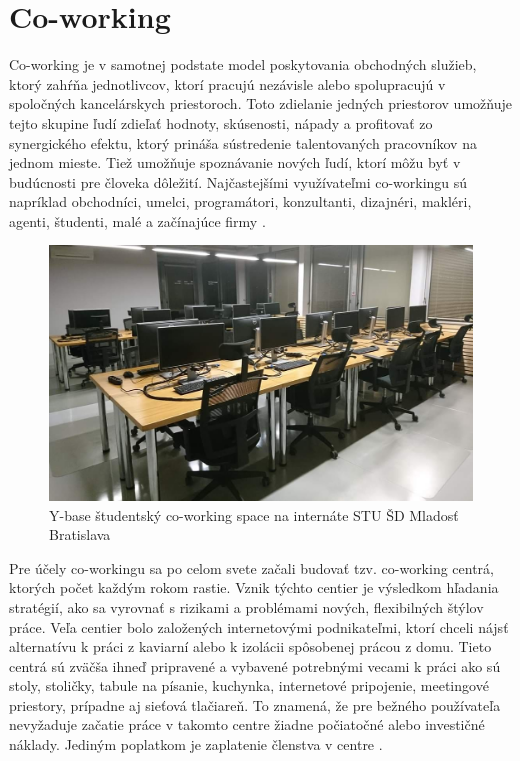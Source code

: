 \section{Co-working}
\indent Co-working je v samotnej podstate model poskytovania obchodných služieb, ktorý zahŕňa jednotlivcov, ktorí pracujú nezávisle alebo spolupracujú v spoločných kancelárskych priestoroch. Toto zdielanie jedných priestorov umožňuje tejto skupine ľudí zdieľať hodnoty, skúsenosti, nápady a profitovať zo synergického efektu, ktorý prináša sústredenie talentovaných pracovníkov na jednom mieste. Tiež umožňuje spoznávanie nových ľudí, ktorí môžu byť v budúcnosti pre človeka dôležití. Najčastejšími využívateľmi co-workingu sú napríklad obchodníci, umelci, programátori, konzultanti, dizajnéri, makléri, agenti, študenti, malé a začínajúce firmy \cite{co_working,co_working_2,co_working_3,co_working_4}.

\begin{figure}[H]
    \centering
    \includegraphics[scale=0.40]{img/ybase.jpg}
    \caption{Y-base študentský co-working space na internáte STU ŠD Mladosť Bratislava}
    \label{fig:img-ybase}
\end{figure}

\indent Pre účely co-workingu sa po celom svete začali budovať tzv. co-working centrá, ktorých počet každým rokom rastie. Vznik týchto centier je výsledkom hľadania stratégií, ako sa vyrovnať s rizikami a problémami nových, flexibilných štýlov práce. Veľa centier bolo založených internetovými podnikateľmi, ktorí chceli nájsť alternatívu k práci z kaviarní alebo k izolácii spôsobenej prácou z domu. Tieto centrá sú zväčša ihneď pripravené a vybavené potrebnými vecami k práci ako sú stoly, stoličky, tabule na písanie, kuchynka, internetové pripojenie, meetingové priestory, prípadne aj sieťová tlačiareň. To znamená, že pre bežného používateľa nevyžaduje začatie práce v takomto centre žiadne počiatočné alebo investičné náklady. Jediným poplatkom je zaplatenie členstva v centre \cite{co_working,co_working_2,co_working_3,co_working_4}. 

